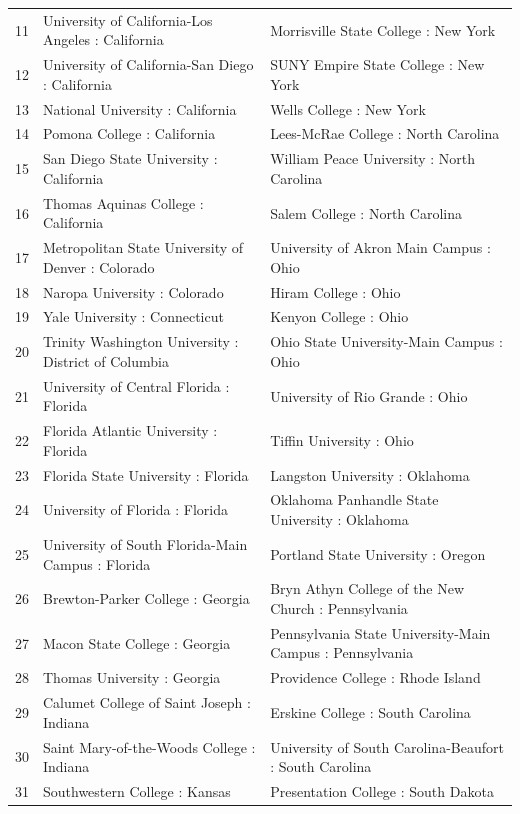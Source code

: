 \documentclass{article}
\begin{document}
\begin{Schunk}
\begin{table}[ht]
\begin{tabular}{rll}
  11 & University of California-Los Angeles : California & Morrisville State College : New York \\ 
  12 & University of California-San Diego : California & SUNY Empire State College : New York \\ 
  13 & National University : California & Wells College : New York \\ 
  14 & Pomona College : California & Lees-McRae College : North Carolina \\ 
  15 & San Diego State University : California & William Peace University : North Carolina \\ 
  16 & Thomas Aquinas College : California & Salem College : North Carolina \\ 
  17 & Metropolitan State University of Denver : Colorado & University of Akron Main Campus : Ohio \\ 
  18 & Naropa University : Colorado & Hiram College : Ohio \\ 
  19 & Yale University : Connecticut & Kenyon College : Ohio \\ 
  20 & Trinity Washington University : District of Columbia & Ohio State University-Main Campus : Ohio \\ 
  21 & University of Central Florida : Florida & University of Rio Grande : Ohio \\ 
  22 & Florida Atlantic University : Florida & Tiffin University : Ohio \\ 
  23 & Florida State University : Florida & Langston University : Oklahoma \\ 
  24 & University of Florida : Florida & Oklahoma Panhandle State University : Oklahoma \\ 
  25 & University of South Florida-Main Campus : Florida & Portland State University : Oregon \\ 
  26 & Brewton-Parker College : Georgia & Bryn Athyn College of the New Church : Pennsylvania \\ 
  27 & Macon State College : Georgia & Pennsylvania State University-Main Campus : Pennsylvania \\ 
  28 & Thomas University : Georgia & Providence College : Rhode Island \\ 
  29 & Calumet College of Saint Joseph : Indiana & Erskine College : South Carolina \\ 
  30 & Saint Mary-of-the-Woods College : Indiana & University of South Carolina-Beaufort : South Carolina \\ 
  31 & Southwestern College : Kansas & Presentation College : South Dakota \\ 

\end{tabular}
\end{table}
\end{Schunk}
\end{document}
